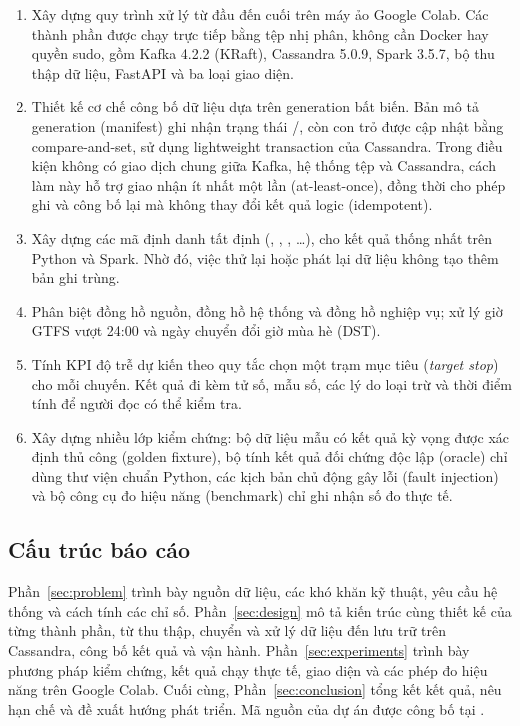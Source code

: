 \begin{enumerate}
    \item Xây dựng quy trình xử lý từ đầu đến cuối trên máy ảo Google Colab. Các thành phần được chạy trực tiếp bằng tệp nhị phân, không cần Docker hay quyền sudo, gồm Kafka 4.2.2 (KRaft), Cassandra 5.0.9, Spark 3.5.7, bộ thu thập dữ liệu, FastAPI và ba loại giao diện.
    \item Thiết kế cơ chế công bố dữ liệu dựa trên generation bất biến. Bản mô tả generation (manifest) ghi nhận trạng thái /, còn con trỏ  được cập nhật bằng compare-and-set, sử dụng lightweight transaction của Cassandra. Trong điều kiện không có giao dịch chung giữa Kafka, hệ thống tệp và Cassandra, cách làm này hỗ trợ giao nhận ít nhất một lần (at-least-once), đồng thời cho phép ghi và công bố lại mà không thay đổi kết quả logic (idempotent).
    \item Xây dựng các mã định danh tất định (, , , \ldots), cho kết quả thống nhất trên Python và Spark. Nhờ đó, việc thử lại hoặc phát lại dữ liệu không tạo thêm bản ghi trùng.
    \item Phân biệt đồng hồ nguồn, đồng hồ hệ thống và đồng hồ nghiệp vụ; xử lý giờ GTFS vượt 24:00 và ngày chuyển đổi giờ mùa hè (DST).
    \item Tính KPI độ trễ dự kiến theo quy tắc chọn một trạm mục tiêu (\textit{target stop}) cho mỗi chuyến. Kết quả đi kèm tử số, mẫu số, các lý do loại trừ và thời điểm tính để người đọc có thể kiểm tra.
    \item Xây dựng nhiều lớp kiểm chứng: bộ dữ liệu mẫu có kết quả kỳ vọng được xác định thủ công (golden fixture), bộ tính kết quả đối chứng độc lập (oracle) chỉ dùng thư viện chuẩn Python, các kịch bản chủ động gây lỗi (fault injection) và bộ công cụ đo hiệu năng (benchmark) chỉ ghi nhận số đo thực tế.
\end{enumerate}

\subsection{Cấu trúc báo cáo}

Phần~\ref{sec:problem} trình bày nguồn dữ liệu, các khó khăn kỹ thuật, yêu cầu hệ thống và cách tính các chỉ số. Phần~\ref{sec:design} mô tả kiến trúc cùng thiết kế của từng thành phần, từ thu thập, chuyển và xử lý dữ liệu đến lưu trữ trên Cassandra, công bố kết quả và vận hành. Phần~\ref{sec:experiments} trình bày phương pháp kiểm chứng, kết quả chạy thực tế, giao diện và các phép đo hiệu năng trên Google Colab. Cuối cùng, Phần~\ref{sec:conclusion} tổng kết kết quả, nêu hạn chế và đề xuất hướng phát triển. Mã nguồn của dự án được công bố tại \cite{repo}.

